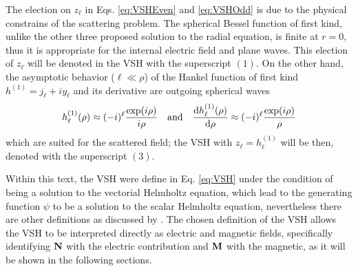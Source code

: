 %
\noindent%
The election on $z_\ell$ in Eqs. \eqref{eq:VSHEven} and  \eqref{eq:VSHOdd} is due to the physical constrains of the scattering problem. The spherical Bessel function of first kind, unlike the other three proposed solution to the radial equation, is finite at $r = 0$, thus it is appropriate for the internal electric field and plane waves. This election of $z_\ell$ will be denoted in the VSH with the superscript $(1)$. On the other hand, the asymptotic behavior ($\ell\ll \rho$) of the Hankel function of first kind $h^{(1)} = j_\ell + i y_\ell$ and its derivative are outgoing spherical waves \cite{bohren_absorption_1983}
\begin{align}
h_\ell^{(1)}(\rho)\approx (-i)^\ell \frac{\exp(i\rho)}{i\rho}
\qqtext{and}
\dv{h_\ell^{(1)}(\rho)}{\rho} \approx (-i)^\ell \frac{\exp(i\rho)}{\rho}
\end{align}
which are suited for the scattered field; the VSH with $z_\ell = h^{(1)}_\ell$ will be then, denoted with the superscript $(3)$.

Within this text, the VSH were define in Eq. \eqref{eq:VSH} under the condition of being a solution to the vectorial Helmholtz equation, which lead to the generating function $\psi$ to be a solution to the scalar Helmholtz equation, nevertheless there are other definitions as discussed by \citeauthor{barrera_vector_1985} \cite{barrera_vector_1985}. The chosen definition of the VSH allows the VSH to be interpreted directly as electric and magnetic fields, specifically identifying $\vb{N}$ with the electric contribution and $\vb{M}$ with the magnetic, as it will be shown in the following sections.













































